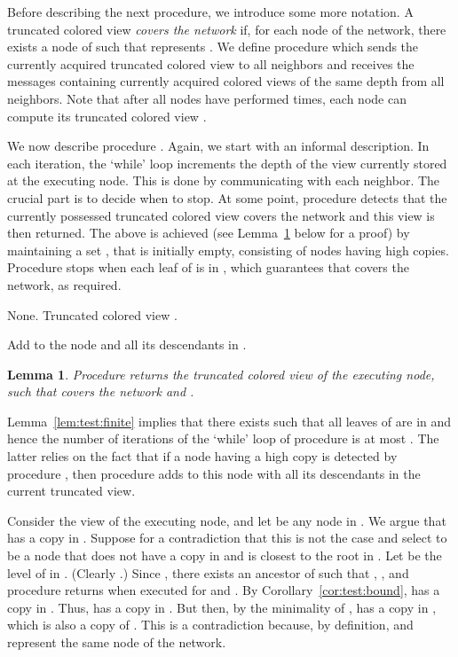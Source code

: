 \documentclass[a4paper,10pt]{article}
\newtheorem{lemma}{Lemma}[section]
\newenvironment{proof}[1][Proof]
{\par\noindent{\bf #1:} }{\hspace*{\fill}\nolinebreak{}\bigskip\par}
\begin{document}
\medskip
Before describing the next procedure, we introduce some more notation.
A truncated colored view  \emph{covers the network} if, for each node  of the network, there exists a node  of  such that  represents .
We define procedure  which sends the currently acquired truncated colored view  to all neighbors and receives the messages containing currently acquired colored views of the same depth  from all neighbors.
Note that after all nodes have performed   times, each node can compute its truncated colored view .

We now describe procedure .
Again, we start with an informal description.
In each iteration, the `while' loop increments the depth of the view currently stored at the executing node.
This is done by communicating with each neighbor.
The crucial part is to decide when to stop.
At some point, procedure  detects that the currently possessed truncated colored view  covers the network and this view is then returned.
The above is achieved (see Lemma~\ref{lem:covered} below for a proof) by maintaining a set , that is initially empty, consisting of nodes having high copies.
Procedure  stops when each leaf of  is in , which guarantees that  covers the network, as required.
\begin{algorithm} \caption{}
\begin{algorithmic}
\REQUIRE None.
\ENSURE Truncated colored view .

\STATE 
\STATE 
{}
         \STATE Add to  the node  and all its descendants in .
      \ENDIF
   \ENDFOR
   \STATE ~ 
   \STATE 
\ENDWHILE
\RETURN 
\end{algorithmic}
\end{algorithm}

\begin{lemma} \label{lem:covered}
Procedure  returns the truncated colored view  of the executing node, such that  covers the network and .
\end{lemma}
\begin{proof}
Lemma~\ref{lem:test:finite} implies that there exists  such that all leaves of  are in  and hence the number of iterations of the `while' loop of procedure  is at most .
The latter relies on the fact that if a node having a high copy is detected by procedure , then procedure  adds to  this node with all its descendants in the current truncated view.

Consider the view  of the executing node, and let  be any node in .
We argue that  has a copy in .
Suppose for a contradiction that this is not the case and select  to be a node that does not have a copy in  and is closest to the root in .
Let  be the level of  in .
(Clearly .)
Since , there exists an ancestor  of  such that , , and procedure  returns  when executed for  and .
By Corollary~\ref{cor:test:bound},  has a copy  in .
Thus,  has a copy  in .
But then, by the minimality of ,  has a copy in , which is also a copy of .
This is a contradiction because, by definition,  and  represent the same node of the network.
\end{proof}
\end{document}
